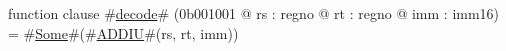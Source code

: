 function clause #\hyperref[zdecode]{decode}# (0b001001 @ rs : regno @ rt : regno @ imm : imm16) =
  #\hyperref[zSome]{Some}#(#\hyperref[zADDIU]{ADDIU}#(rs, rt, imm))
